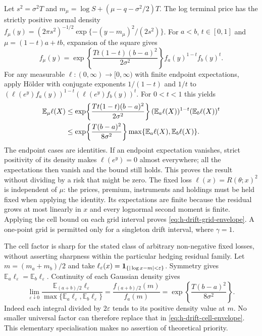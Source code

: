 \documentclass[11pt]{article}
\begin{document}
Let $s^2=\sigma^2T$ and $m_\mu=\log S+(\mu-q-\sigma^2/2)T$.
The log terminal price has the strictly positive normal density
$f_\mu(y)=(2\pi s^2)^{-1/2}\exp\{-(y-m_\mu)^2/(2s^2)\}$.
For $a<b$, $t\in[0,1]$ and $\mu=(1-t)a+tb$, expansion of the square gives
\begin{equation}
 f_\mu(y)=
 \exp\!\left\{\frac{Tt(1-t)(b-a)^2}{2\sigma^2}\right\}
 f_a(y)^{1-t}f_b(y)^t.
 \label{eq:h-drift-density-identity}
\end{equation}
For any measurable $\ell:(0,\infty)\to[0,\infty)$ with finite endpoint
expectations, apply H\"older with conjugate exponents $1/(1-t)$ and $1/t$
to $(\ell(e^y)f_a(y))^{1-t}(\ell(e^y)f_b(y))^t$. For $0<t<1$ this yields
\begin{align}
 \mathbb E_\mu\ell(X)
 &\leq\exp\!\left\{\frac{Tt(1-t)(b-a)^2}{2\sigma^2}\right\}
   (\mathbb E_a\ell(X))^{1-t}(\mathbb E_b\ell(X))^t\notag\\
 &\leq\exp\!\left\{\frac{T(b-a)^2}{8\sigma^2}\right\}
   \max\{\mathbb E_a\ell(X),\mathbb E_b\ell(X)\}.
 \label{eq:h-drift-cell-envelope}
\end{align}
The endpoint cases are identities. If an endpoint expectation vanishes,
strict positivity of its density makes $\ell(e^y)=0$ almost everywhere;
all the expectations then vanish and the bound still holds. This proves
the result without dividing by a risk that might be zero. The fixed
loss $\ell(x)=R(\theta;x)^2$ is independent of $\mu$: the prices,
premium, instruments and holdings must be held fixed when applying the
identity. Its expectations are finite because the residual grows at most
linearly in $x$ and every lognormal second moment is finite. Applying the
cell bound on each grid interval proves \eqref{eq:h-drift-grid-envelope}.
A one-point grid is permitted only for a singleton drift interval, where
$\gamma=1$.

The cell factor is sharp for the stated class of arbitrary non-negative
fixed losses, without asserting sharpness within the particular hedging
residual family. Let $m=(m_a+m_b)/2$ and take
$\ell_\varepsilon(x)={\bf1}_{\{|\log x-m|<\varepsilon\}}$.
Symmetry gives $\mathbb E_a\ell_\varepsilon=\mathbb E_b\ell_\varepsilon$.
Continuity of each Gaussian density gives
\begin{equation}
 \lim_{\varepsilon\downarrow0}
 \frac{\mathbb E_{(a+b)/2}\ell_\varepsilon}
      {\max\{\mathbb E_a\ell_\varepsilon,
             \mathbb E_b\ell_\varepsilon\}}
 =\frac{f_{(a+b)/2}(m)}{f_a(m)}
 =\exp\!\left\{\frac{T(b-a)^2}{8\sigma^2}\right\}.
 \label{eq:h-drift-cell-sharpness}
\end{equation}
Indeed each integral divided by $2\varepsilon$ tends to its positive
density value at $m$. No smaller universal factor can therefore replace
that in \eqref{eq:h-drift-cell-envelope}. This elementary specialisation
makes no assertion of theoretical priority.
\end{document}
